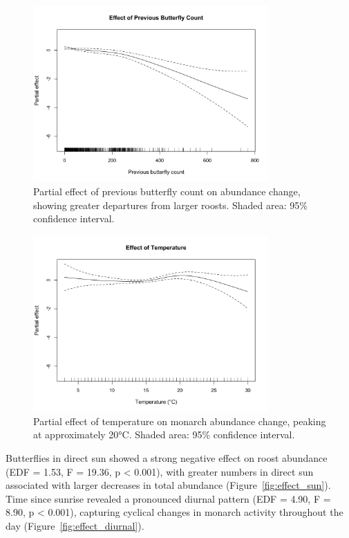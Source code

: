 \begin{figure}[htbp]
\centering
\includegraphics[width=0.8\textwidth]{supplemental/results/thesis_exports/figures/effect_previous_butterfly_count.png}
\caption{Partial effect of previous butterfly count on abundance change, showing greater departures from larger roosts. Shaded area: 95\% confidence interval.}\label{fig:effect_roost_size}
\end{figure}

\begin{figure}[htbp]
\centering
\includegraphics[width=0.8\textwidth]{supplemental/results/thesis_exports/figures/effect_temperature.png}
\caption{Partial effect of temperature on monarch abundance change, peaking at approximately 20°C. Shaded area: 95\% confidence interval.}\label{fig:effect_temperature}
\end{figure}

Butterflies in direct sun showed a strong negative effect on roost abundance (EDF = 1.53, F = 19.36, p < 0.001), with greater numbers in direct sun associated with larger decreases in total abundance (Figure~\ref{fig:effect_sun}). Time since sunrise revealed a pronounced diurnal pattern (EDF = 4.90, F = 8.90, p < 0.001), capturing cyclical changes in monarch activity throughout the day (Figure~\ref{fig:effect_diurnal}).

